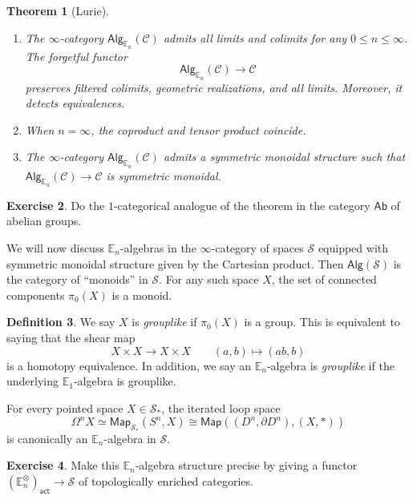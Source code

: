 \documentclass[10pt, oneside]{memoir}
\newtheorem{thm}{Theorem}[subsection]
\theoremstyle{definition}
\newtheorem{defn}[thm]{Definition}
\newtheorem{exer}[thm]{Exercise}
\theoremstyle{remark}
\theoremstyle{plain}
\theoremstyle{definition}
\theoremstyle{remark}
\newcommand{\E}{\mathbb{E}}
\newcommand{\mc}[1]{\mathcal{#1}}
\newcommand{\ms}[1]{\mathsf{#1}}
\newcommand{\1}{\mathbf{1}}
\newcommand{\2}{\mathbf{2}}
\newcommand{\3}{\mathbf{3}}
\begin{document}
\begin{thm}[Lurie]\leavevmode
    \begin{enumerate}
        \item The \(\infty \)-category \(\ms{Alg}_{\E_n}(\mc{C}) \) admits all limits and colimits for any \(0 \leq n \leq \infty \). The forgetful functor
        \[ \ms{Alg}_{\E_n}(\mc{C}) \to \mc{C} \]
        preserves filtered colimits, geometric realizations, and all limits. Moreover, it detects equivalences.
        \item When \(n = \infty \), the coproduct and tensor product coincide.
        \item The \(\infty \)-category \(\ms{Alg}_{\E_n}(\mc{C}) \) admits a symmetric monoidal structure such that \(\ms{Alg}_{\E_n}(\mc{C}) \to \mc{C} \) is symmetric monoidal.
    \end{enumerate}
\end{thm}

\begin{exer}
    Do the \(1 \)-categorical analogue of the theorem in the category \(\ms{Ab} \) of abelian groups.
\end{exer}

We will now discuss \(\E_n \)-algebras in the \(\infty \)-category of spaces \(\mc{S} \) equipped with symmetric monoidal structure given by the Cartesian product. Then \(\ms{Alg}(\mc{S}) \) is the category of ``monoids'' in \(\mc{S} \). For any such space \(X \), the set of connected components \(\pi_0(X) \) is a monoid.

\begin{defn}
    We say \(X \) is \textit{grouplike} if \(\pi_0 (X) \) is a group. This is equivalent to saying that the shear map
    \[ X \times X \to X \times X \qquad (a,b) \mapsto (ab, b) \]
    is a homotopy equivalence. In addition, we say an \(\E_n \)-algebra is \textit{grouplike} if the underlying \(\E_1 \)-algebra is grouplike.
\end{defn}

For every pointed space \(X \in \mc{S}_* \), the iterated loop space
\[ \Omega^n X \simeq \ms{Map}_{\mc{S}_*}(S^n, X) \cong \ms{Map}((D^n, \partial D^n), (X, *)) \]
is canonically an \(\E_n \)-algebra in \(\mc{S} \).

\begin{exer}
    Make this \(\E_n \)-algebra structure precise by giving a functor \((\E_n^{\otimes})_{\ms{act}} \to \mc{S} \) of topologically enriched categories.
\end{exer}
\end{document}
